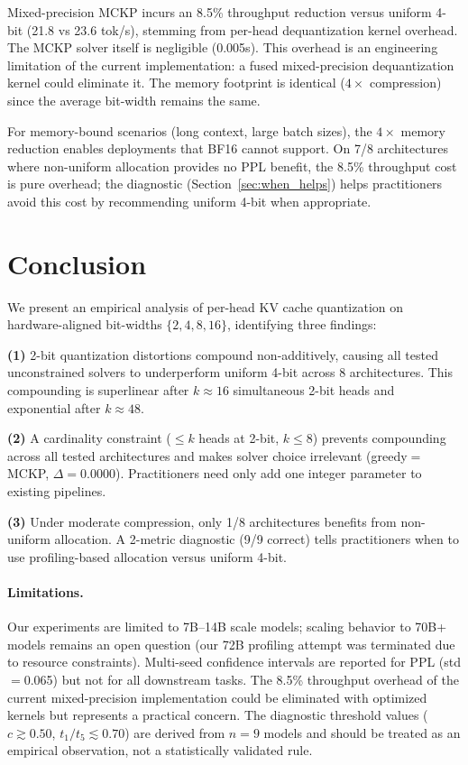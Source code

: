 \documentclass[11pt,a4paper]{article}
\begin{document}
Mixed-precision MCKP incurs an 8.5\% throughput reduction versus uniform 4-bit (21.8 vs 23.6 tok/s), stemming from per-head dequantization kernel overhead.
The MCKP solver itself is negligible (0.005s).
This overhead is an engineering limitation of the current implementation: a fused mixed-precision dequantization kernel could eliminate it.
The memory footprint is identical ($4\times$ compression) since the average bit-width remains the same.

For memory-bound scenarios (long context, large batch sizes), the $4\times$ memory reduction enables deployments that BF16 cannot support.
On 7/8 architectures where non-uniform allocation provides no PPL benefit, the 8.5\% throughput cost is pure overhead; the diagnostic (Section~\ref{sec:when_helps}) helps practitioners avoid this cost by recommending uniform 4-bit when appropriate.

\section{Conclusion}
\label{sec:conclusion}

We present an empirical analysis of per-head KV cache quantization on hardware-aligned bit-widths $\{2,4,8,16\}$, identifying three findings:

\textbf{(1)} 2-bit quantization distortions compound non-additively, causing all tested unconstrained solvers to underperform uniform 4-bit across 8 architectures.
This compounding is superlinear after $k{\approx}16$ simultaneous 2-bit heads and exponential after $k{\approx}48$.

\textbf{(2)} A cardinality constraint ($\le k$ heads at 2-bit, $k{\le}8$) prevents compounding across all tested architectures and makes solver choice irrelevant (greedy$=$MCKP, $\Delta{=}0.0000$).
Practitioners need only add one integer parameter to existing pipelines.

\textbf{(3)} Under moderate compression, only 1/8 architectures benefits from non-uniform allocation.
A 2-metric diagnostic (9/9 correct) tells practitioners when to use profiling-based allocation versus uniform 4-bit.

\paragraph{Limitations.}
Our experiments are limited to 7B--14B scale models; scaling behavior to 70B+ models remains an open question (our 72B profiling attempt was terminated due to resource constraints).
Multi-seed confidence intervals are reported for PPL (std$=$0.065) but not for all downstream tasks.
The 8.5\% throughput overhead of the current mixed-precision implementation could be eliminated with optimized kernels but represents a practical concern.
The diagnostic threshold values ($c{\gtrsim}0.50$, $t_1/t_5{\lesssim}0.70$) are derived from $n{=}9$ models and should be treated as an empirical observation, not a statistically validated rule.
\end{document}
